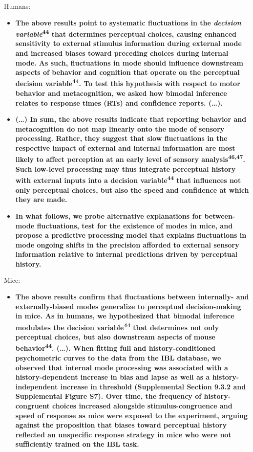 \documentclass[
]{article}
\providecommand{\tightlist}{%
  \setlength{\itemsep}{0pt}\setlength{\parskip}{0pt}}
\begin{document}
Humans:

\begin{itemize}
\item
  \textbf{The above results point to systematic fluctuations in the
  \emph{decision variable}\textsuperscript{44} that determines
  perceptual choices, causing enhanced sensitivity to external stimulus
  information during external mode and increased biases toward preceding
  choices during internal mode. As such, fluctuations in mode should
  influence downstream aspects of behavior and cognition that operate on
  the perceptual decision variable\textsuperscript{44}. To test this
  hypothesis with respect to motor behavior and metacognition, we asked
  how bimodal inference relates to response times (RTs) and confidence
  reports. (\ldots). }
\item
  \textbf{(\ldots) In sum, the above results indicate that reporting
  behavior and metacognition do not map linearly onto the mode of
  sensory processing. Rather, they suggest that slow fluctuations in the
  respective impact of external and internal information are most likely
  to affect perception at an early level of sensory
  analysis\textsuperscript{46,47}. Such low-level processing may thus
  integrate perceptual history with external inputs into a decision
  variable\textsuperscript{44} that influences not only perceptual
  choices, but also the speed and confidence at which they are made.}
\item
  \textbf{In what follows, we probe alternative explanations for
  between-mode fluctuations, test for the existence of modes in mice,
  and propose a predictive processing model that explains fluctuations
  in mode ongoing shifts in the precision afforded to external sensory
  information relative to internal predictions driven by perceptual
  history.}
\end{itemize}

Mice:

\begin{itemize}
\tightlist
\item
  \textbf{The above results confirm that fluctuations between
  internally- and externally-biased modes generalize to perceptual
  decision-making in mice. As in humans, we hypothesized that bimodal
  inference modulates the decision variable\textsuperscript{44} that
  determines not only perceptual choices, but also downstream aspects of
  mouse behavior\textsuperscript{44}. (\ldots). When fitting full and
  history-conditioned psychometric curves to the data from the IBL
  database, we observed that internal mode processing was associated
  with a history-dependent increase in bias and lapse as well as a
  history-independent increase in threshold (Supplemental Section 9.3.2
  and Supplemental Figure S7). Over time, the frequency of
  history-congruent choices increased alongside stimulus-congruence and
  speed of response as mice were exposed to the experiment, arguing
  against the proposition that biases toward perceptual history
  reflected an unspecific response strategy in mice who were not
  sufficiently trained on the IBL task.}
\end{itemize}
\end{document}
